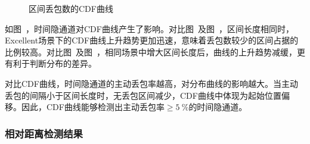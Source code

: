 {\begin{figure}[htbp]
{        }
        \caption{区间丢包数的CDF曲线}
        \label{fig:3:result:win:cdf}
	\end{figure}
}

如图\ ，时间隐通道对CDF曲线产生了影响。对比图\ 及图\ ，区间长度相同时，Excellent场景下的CDF曲线上升趋势更加迅速，意味着丢包数较少的区间占据的比例较高。对比图\ 及图\ ，相同场景中增大区间长度后，曲线的上升趋势减缓，更有利于判断分布的差异。

对比CDF曲线，时间隐通道的主动丢包率越高，对分布曲线的影响越大。当主动丢包的间隔小于区间长度时，无丢包区间减少，CDF曲线中体现为起始位置偏移。因此，CDF曲线能够检测出主动丢包率$\ge 5\ \%$的时间隐通道。

\subsubsection{相对距离检测结果}
\label{chap:analyze:result:window:distance}

